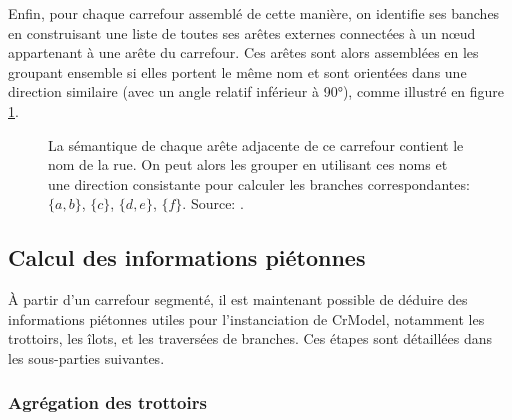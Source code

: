 \newpar{}

Enfin, pour chaque carrefour assemblé de cette manière, on identifie ses banches en construisant une liste de toutes ses arêtes externes connectées à un nœud appartenant à une arête du carrefour. Ces arêtes sont alors assemblées en les groupant ensemble si elles portent le même nom et sont orientées dans une direction similaire (avec un angle relatif inférieur à 90°), comme illustré en figure \ref{fig:modelisation_mergeBranches}.

\begin{figure}[ht]
    \centering
    \caption[Identification des branches d'un carrefour]{La sémantique de chaque arête adjacente de ce carrefour contient le nom de la rue. On peut alors les grouper en utilisant ces noms et une direction consistante pour calculer les branches correspondantes: $\{a, b\}$, $\{c\}$, $\{d, e\}$, $\{f\}$. Source: \citep{Favreau2022}.}
    \label{fig:modelisation_mergeBranches}
\end{figure}

\subsection{Calcul des informations piétonnes}

\label{sec:modelisation_calcul_info_pietonnes}

À partir d'un carrefour segmenté, il est maintenant possible de déduire des informations piétonnes utiles pour l'instanciation de CrModel, notamment les trottoirs, les îlots, et les traversées de branches. Ces étapes sont détaillées dans les sous-parties suivantes.

\subsubsection{Agrégation des trottoirs}

